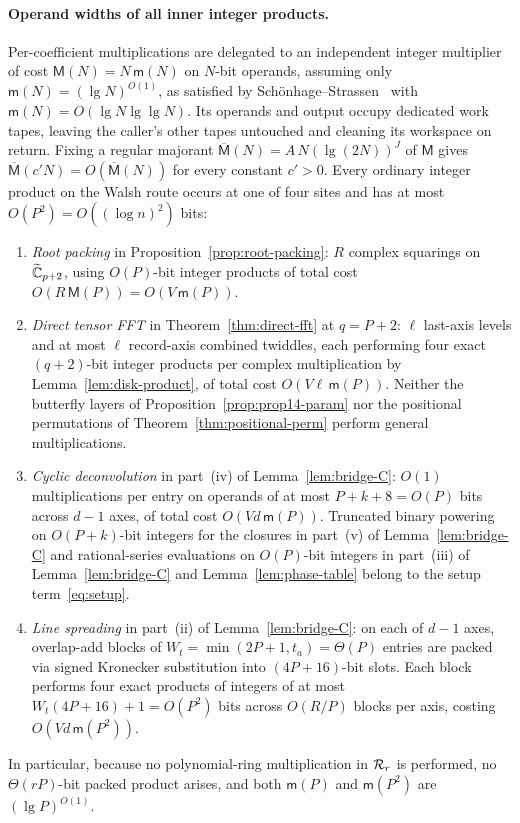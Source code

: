 \paragraph{Operand widths of all inner integer products.}
Per-coefficient multiplications are delegated to an independent integer multiplier of cost
$\mathsf M(N)=N\,\mathsf m(N)$ on $N$-bit operands, assuming only $\mathsf m(N)=(\lg N)^{O(1)}$, as satisfied by
Sch\"onhage--Strassen~\cite{SS71} with $\mathsf m(N)=O(\lg N\lg\lg N)$. Its operands and output occupy dedicated work
tapes, leaving the caller's other tapes untouched and cleaning its workspace on return. Fixing a regular majorant
$\overline{\mathsf M}(N)=A\,N(\lg(2N))^J$ of $\mathsf M$ gives $\overline{\mathsf M}(c'N)=O(\overline{\mathsf M}(N))$
for every constant $c'>0$. Every ordinary integer product on the Walsh route occurs at one of four sites and has at most
$O(P^2)=O((\log n)^2)$ bits:
\begin{enumerate}[label=(\arabic*),leftmargin=*]
  \item \emph{Root packing} in Proposition~\ref{prop:root-packing}: $R$ complex squarings on $\widetilde{\mathbb{C}}_{p+2}$, using
    $O(P)$-bit integer products of total cost $O(R\,\mathsf M(P))=O(V\,\mathsf m(P))$.

  \item \emph{Direct tensor FFT} in Theorem~\ref{thm:direct-fft} at $q=P+2$: $\ell$ last-axis levels and at most $\ell$
    record-axis combined twiddles, each performing four exact $(q+2)$-bit integer products per complex multiplication by
    Lemma~\ref{lem:disk-product}, of total cost $O(V\ell\,\mathsf m(P))$. Neither the butterfly layers of
    Proposition~\ref{prop:prop14-param} nor the positional permutations of Theorem~\ref{thm:positional-perm} perform
    general multiplications.

  \item \emph{Cyclic deconvolution} in part~(iv) of Lemma~\ref{lem:bridge-C}: $O(1)$ multiplications per entry on
    operands of at most $P+k+8=O(P)$ bits across $d-1$ axes, of total cost $O(Vd\,\mathsf m(P))$. Truncated binary
    powering on $O(P+k)$-bit integers for the closures in part~(v) of Lemma~\ref{lem:bridge-C} and rational-series
    evaluations on $O(P)$-bit integers in part~(iii) of Lemma~\ref{lem:bridge-C} and Lemma~\ref{lem:phase-table} belong
    to the setup term~\eqref{eq:setup}.

  \item \emph{Line spreading} in part~(ii) of Lemma~\ref{lem:bridge-C}: on each of $d-1$ axes, overlap-add blocks of
    $W_t=\min(2P+1,t_a)=\Theta(P)$ entries are packed via signed Kronecker substitution into $(4P+16)$-bit slots. Each
    block performs four exact products of integers of at most $W_t(4P+16)+1=O(P^2)$ bits across $O(R/P)$ blocks per
    axis, costing $O(Vd\,\mathsf m(P^2))$.
\end{enumerate}
In particular, because no polynomial-ring multiplication in $\mathcal{R}_r$ is performed, no $\Theta(rP)$-bit packed product
arises, and both $\mathsf m(P)$ and $\mathsf m(P^2)$ are $(\lg P)^{O(1)}$.

